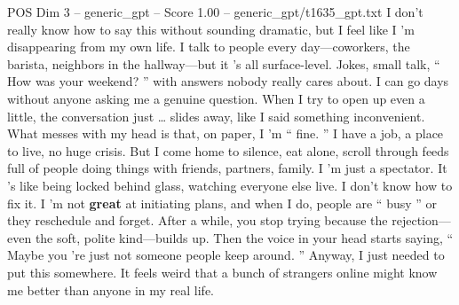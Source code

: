 \begin{textsample}{POS Dim 3 – generic\_gpt – Score 1.00 – generic\_gpt/t1635\_gpt.txt}  \label{ex:f3_pos_035}
I don't really know how to say this without sounding dramatic, but I feel like I ’m disappearing from my own life.
I talk to people every day—coworkers, the barista, neighbors in the hallway—but it ’s all surface-level.
Jokes, small talk, “ How was your weekend? ” with answers nobody really cares about.
I can go days without anyone asking me a genuine question.
When I try to open up even a little, the conversation just … slides away, like I said something inconvenient.
What messes with my head is that, on paper, I ’m “ fine. ” I have a job, a place to live, no huge crisis.
But I come home to silence, eat alone, scroll through feeds full of people doing things with friends, partners, family.
I ’m just a spectator.
It ’s like being locked behind glass, watching everyone else live.
I don't know how to fix it.
I ’m not \textbf{great} at initiating plans, and when I do, people are “ busy ” or they reschedule and forget.
After a while, you stop trying because the rejection—even the soft, polite kind—builds up.
Then the voice in your head starts saying, “ Maybe you ’re just not someone people keep around. ” Anyway, I just needed to put this somewhere.
It feels weird that a bunch of strangers online might know me better than anyone in my real life.

\end{textsample}
